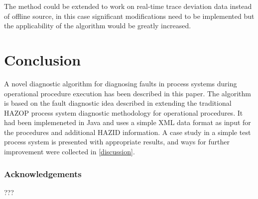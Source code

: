 \documentclass[conference]{IEEEtran}
\begin{document}
The method could be extended to work on real-time trace deviation data instead of offline source, in this case significant modifications need to be implemented but the applicability of the algorithm would be greatly increased.

\section{Conclusion}
A novel diagnostic algorithm for diagnosing faults in process systems during operational procedure execution has been described in this paper. The algorithm is based on the fault diagnostic idea described in \cite{KES2011} extending the traditional HAZOP process system diagnostic methodology for operational procedures. It had been implemeneted in Java and uses a simple XML data format as input for the procedures and additional HAZID information. A case study in a simple test process system is presented with appropriate results, and ways for further improvement were collected in \ref{discussion}.

\subsubsection{Acknowledgements}

???
\end{document}
